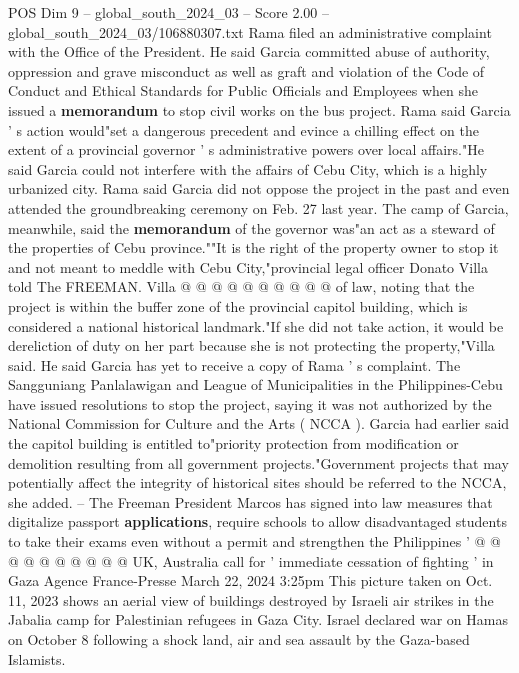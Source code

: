 \begin{textsample}{POS Dim 9 – global\_south\_2024\_03 – Score 2.00 – global\_south\_2024\_03/106880307.txt}  \label{ex:f9_pos_068}
Rama filed an administrative complaint with the Office of the President.
He said Garcia committed abuse of authority, oppression and grave misconduct as well as graft and violation of the Code of Conduct and Ethical Standards for Public Officials and Employees when she issued a \textbf{memorandum} to stop civil works on the bus project.
Rama said Garcia ' s action would"set a dangerous precedent and evince a chilling effect on the extent of a provincial governor ' s administrative powers over local affairs."He said Garcia could not interfere with the affairs of Cebu City, which is a highly urbanized city.
Rama said Garcia did not oppose the project in the past and even attended the groundbreaking ceremony on Feb. 27 last year.
The camp of Garcia, meanwhile, said the \textbf{memorandum} of the governor was"an act as a steward of the properties of Cebu province.""It is the right of the property owner to stop it and not meant to meddle with Cebu City,"provincial legal officer Donato Villa told The FREEMAN.
Villa @ @ @ @ @ @ @ @ @ @ of law, noting that the project is within the buffer zone of the provincial capitol building, which is considered a national historical landmark."If she did not take action, it would be dereliction of duty on her part because she is not protecting the property,"Villa said.
He said Garcia has yet to receive a copy of Rama ' s complaint.
The Sangguniang Panlalawigan and League of Municipalities in the Philippines-Cebu have issued resolutions to stop the project, saying it was not authorized by the National Commission for Culture and the Arts ( NCCA ).
Garcia had earlier said the capitol building is entitled to"priority protection from modification or demolition resulting from all government projects."Government projects that may potentially affect the integrity of historical sites should be referred to the NCCA, she added. -- The Freeman President Marcos has signed into law measures that digitalize passport \textbf{applications}, require schools to allow disadvantaged students to take their exams even without a permit and strengthen the Philippines ' @ @ @ @ @ @ @ @ @ @ UK, Australia call for ' immediate cessation of fighting ' in Gaza Agence France-Presse March 22, 2024 3:25pm This picture taken on Oct. 11, 2023 shows an aerial view of buildings destroyed by Israeli air strikes in the Jabalia camp for Palestinian refugees in Gaza City.
Israel declared war on Hamas on October 8 following a shock land, air and sea assault by the Gaza-based Islamists.

\end{textsample}
